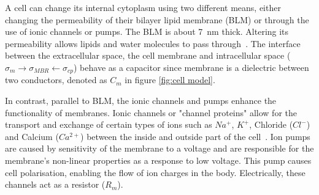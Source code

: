 A cell can change its internal cytoplasm using two different means, either changing the permeability of their bilayer lipid membrane (BLM) or through the use of ionic channels or pumps. The BLM is about \SI{7}{\nano\meter} thick. Altering its permeability allows lipids and water molecules to pass through~\cite{ivorra2003bioimpedance}. The interface between the extracellular space, the cell membrane and intracellular space ($\sigma_m \rightarrow \sigma_{MBR} \leftarrow \sigma_{cp}$) behave as a capacitor since membrane is a dielectric between two conductors, denoted as $C_m$ in figure \ref{fig:cell model}.

In contrast, parallel to BLM, the ionic channels and pumps enhance the functionality of membranes. Ionic channels or "channel proteins" allow for the transport and exchange of certain types of ions such as $Na^{+}$, $K^{+}$, Chloride ($Cl^{-}$) and Calcium ($Ca^{2+}$) between the inside and outside part of the cell~\cite{lvovich2012impedance}. Ion pumps are caused by sensitivity of the membrane to a voltage and are responsible for the membrane's non-linear properties as a response to low voltage. This pump causes cell polarisation, enabling the flow of ion charges in the body. Electrically, these channels act as a resistor ($R_m$).

